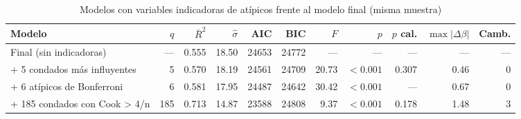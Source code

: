\begin{table}[htbp]
\centering
\footnotesize\setlength{\tabcolsep}{3.5pt}
\caption{Modelos con variables indicadoras de atípicos frente al modelo final (misma muestra)}\label{tab:indicadoras}
\begin{tabularx}{\linewidth}{>{\raggedright\arraybackslash}X r r r r r r r r r r}
\toprule
Modelo & $q$ & $\bar R^2$ & $\hat\sigma$ & AIC & BIC & $F$ & $p$ & $p$ cal. & $\max|\Delta\beta|$ & Camb. \\
\midrule
Final (sin indicadoras) & --- & \num{0.555} & \num{18.50} & \num{24653} & \num{24772} & --- & --- & --- & --- & --- \\
+ 5 condados más influyentes & \num{5} & \num{0.570} & \num{18.19} & \num{24561} & \num{24709} & \num{20.73} & $<\num{0.001}$ & \num{0.307} & \num{0.46} & \num{0} \\
+ 6 atípicos de Bonferroni & \num{6} & \num{0.581} & \num{17.95} & \num{24487} & \num{24642} & \num{30.42} & $<\num{0.001}$ & --- & \num{0.67} & \num{0} \\
+ 185 condados con Cook > 4/n & \num{185} & \num{0.713} & \num{14.87} & \num{23588} & \num{24808} & \num{9.37} & $<\num{0.001}$ & \num{0.178} & \num{1.48} & \num{3} \\
\bottomrule
\end{tabularx}
\par{}
\end{table}
